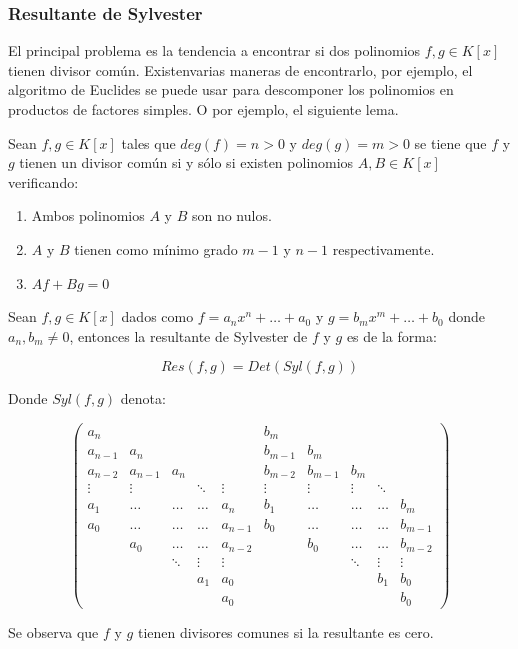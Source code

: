 \subsubsection*{Resultante de Sylvester}

El principal problema es la tendencia a encontrar si dos polinomios $f, g \in K[x]$ tienen divisor común. Existenvarias maneras de encontrarlo, por ejemplo, el algoritmo de Euclides se puede usar para descomponer los polinomios en productos de factores simples. O por ejemplo, el siguiente lema.

\begin{lemma}
	Sean $f,g \in K[x]$ tales que $deg(f) = n > 0$ y $deg(g) = m > 0$ se tiene que $f$ y $g$ tienen un divisor común si y sólo si existen polinomios $A, B \in K[x]$ verificando:
	\begin{enumerate}
		\item Ambos polinomios $A$ y $B$ son no nulos.
		\item $A$ y $B$ tienen como mínimo grado $m-1$ y $n-1$ respectivamente.
		\item $Af + Bg = 0$
	\end{enumerate}
\end{lemma}

\begin{definition}
	Sean $f, g \in K[x]$ dados como $f = a_n x^n + \dotso + a_0$ y $g = b_m x^m + \dotso + b_0$ donde $a_n, b_m \neq 0$, entonces la resultante de Sylvester de $f$ y $g$ es de la forma:
	
	$$Res(f,g) = Det(Syl(f,g))$$
	
	Donde $Syl(f,g)$ denota:
	
	$$\begin{pmatrix}
	a_n & & & & & b_m & & & & \\
	a_{n-1} & a_n & & & & b_{m-1} & b_m & & & \\
	a_{n-2} & a_{n-1} & a_n & & & b_{m-2} & b_{m-1} & b_m & & \\
	\vdots & \vdots & & \ddots & \vdots & \vdots & \vdots & \vdots & \ddots & \\
	a_1 & \dotso & \dotso & \dotso & a_{n} & b_1 & \dotso & \dotso & \dotso & b_{m} \\
	a_0 & \dotso & \dotso & \dotso & a_{n-1} & b_0 & \dotso & \dotso & \dotso & b_{m-1} \\
	 & a_0 & \dotso & \dotso & a_{n-2} & & b_0 & \dotso & \dotso & b_{m-2} \\
	 & & \ddots & \vdots & \vdots & & & \ddots & \vdots & \vdots \\
	 & & & a_1 & a_0 & & & & b_1 & b_0 \\
	 & & & & a_0 & & & & & b_0
	\end{pmatrix}$$
	
	Se observa que $f$ y $g$ tienen divisores comunes si la resultante es cero.
	
\end{definition}

